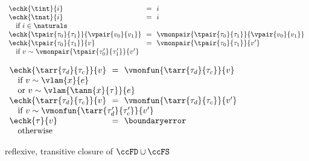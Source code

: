 \begin{flushleft}
\medskip
{}
\begin{minipage}[t]{\columnwidth}
$\begin{array}{l@{~~}c@{~~}l}
  \echk{\tint}{i} & = & i
\\
  \echk{\tnat}{i} & = & i
\\ \multicolumn{3}{l}{\mbox{\quad if $i \in \naturals$}}
\\
  \echk{\tpair{\tau_0}{\tau_1}}{\vpair{v_0}{v_1}} & = & \vmonpair{\tpair{\tau_0}{\tau_1}}{\vpair{v_0}{v_1}}
\\
  \echk{\tpair{\tau_0}{\tau_1}}{v} & = & \vmonpair{\tpair{\tau_0}{\tau_1}}{v'}
\\ \multicolumn{3}{l}{\mbox{\quad if $v \sim \vmonpair{\tpair{\tau_0'}{\tau_1'}}{v'}$}}
\end{array}$
\end{minipage}%
\begin{minipage}[t]{\columnwidth}
$\begin{array}{l@{~~}c@{~~}l}
  \echk{\tarr{\tau_d}{\tau_c}}{v} & = & \vmonfun{\tarr{\tau_d}{\tau_c}}{v}
\\ \multicolumn{3}{l}{\mbox{\quad if $v \sim \vlam{x}{e}$}}
\\ \multicolumn{3}{l}{\mbox{\quad or $v \sim \vlam{\tann{x}{\tau}}{e}$}}
\\
  \echk{\tarr{\tau_d}{\tau_c}}{v} & = & \vmonfun{\tarr{\tau_d}{\tau_c}}{v'}
\\ \multicolumn{3}{l}{\mbox{\quad if $v \sim \vmonfun{\tarr{\tau_d'}{\tau_c'}}{v'}$}}
\\
  \echk{\tau}{v} & = & \boundaryerror
\\ \multicolumn{3}{l}{\mbox{\quad otherwise}}
\end{array}$
\end{minipage}

\medskip
{} reflexive, transitive closure of $\ccFD \cup \ccFS$
\smallskip
\end{flushleft}
